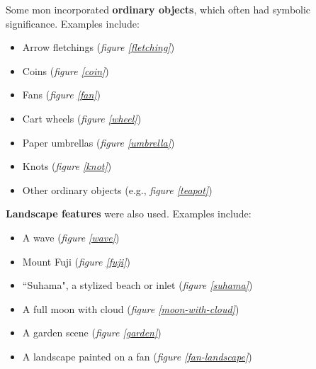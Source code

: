 \documentclass{article}
\begin{document}
  Some mon incorporated \textbf{ordinary objects}, which often had symbolic
  significance.  Examples include:

\begin{multicols}{2}
\begin{itemize}
\item Arrow fletchings (\emph{figure \ref{fletching}})
\item Coins (\emph{figure \ref{coin}})
\item Fans (\emph{figure \ref{fan}})
\item Cart wheels (\emph{figure \ref{wheel}})
\item Paper umbrellas (\emph{figure \ref{umbrella}})
\item Knots (\emph{figure \ref{knot}})
\item Other ordinary objects (e.g., \emph{figure \ref{teapot}})
\end{itemize}
\end{multicols}


  \begin{figure}[b!]
  \begin{subfigs}
  \end{subfigs}
  \begin{subfigs}
  \end{subfigs}
  \end{figure}

\clearpage

  \textbf{Landscape features} were also used.  Examples include:

\begin{itemize}
\item A wave (\emph{figure \ref{wave}})
\item Mount Fuji (\emph{figure \ref{fuji}})
\item ``Suhama", a stylized beach or inlet (\emph{figure \ref{suhama}})
\item A full moon with cloud (\emph{figure \ref{moon-with-cloud}})
\item A garden scene (\emph{figure \ref{garden}})
\item A landscape painted on a fan (\emph{figure \ref{fan-landscape}})
\end{itemize}
\end{document}
